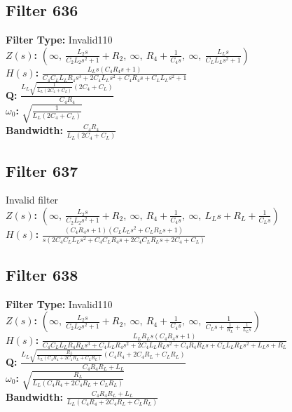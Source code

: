 \documentclass{article}
\begin{document}
\subsection*{Filter 636}
\textbf{Filter Type:} Invalid110 \\ 
\textbf{$Z(s)$:} $\left( \infty, \  \frac{L_{2} s}{C_{2} L_{2} s^{2} + 1} + R_{2}, \  \infty, \  R_{4} + \frac{1}{C_{4} s}, \  \infty, \  \frac{L_{L} s}{C_{L} L_{L} s^{2} + 1}\right)$ \\ 
\textbf{$H(s)$:} $\frac{L_{L} s \left(C_{4} R_{4} s + 1\right)}{C_{4} C_{L} L_{L} R_{4} s^{3} + 2 C_{4} L_{L} s^{2} + C_{4} R_{4} s + C_{L} L_{L} s^{2} + 1}$ \\ 
\textbf{Q:} $\frac{L_{L} \sqrt{\frac{1}{L_{L} \left(2 C_{4} + C_{L}\right)}} \left(2 C_{4} + C_{L}\right)}{C_{4} R_{4}}$ \\ 
\textbf{$\omega_0$:} $\sqrt{\frac{1}{L_{L} \left(2 C_{4} + C_{L}\right)}}$ \\ 
\textbf{Bandwidth:} $\frac{C_{4} R_{4}}{L_{L} \left(2 C_{4} + C_{L}\right)}$ \\ 
\subsection*{Filter 637}
Invalid filter \\ 
\textbf{$Z(s)$:} $\left( \infty, \  \frac{L_{2} s}{C_{2} L_{2} s^{2} + 1} + R_{2}, \  \infty, \  R_{4} + \frac{1}{C_{4} s}, \  \infty, \  L_{L} s + R_{L} + \frac{1}{C_{L} s}\right)$ \\ 
\textbf{$H(s)$:} $\frac{\left(C_{4} R_{4} s + 1\right) \left(C_{L} L_{L} s^{2} + C_{L} R_{L} s + 1\right)}{s \left(2 C_{4} C_{L} L_{L} s^{2} + C_{4} C_{L} R_{4} s + 2 C_{4} C_{L} R_{L} s + 2 C_{4} + C_{L}\right)}$ \\ 
\subsection*{Filter 638}
\textbf{Filter Type:} Invalid110 \\ 
\textbf{$Z(s)$:} $\left( \infty, \  \frac{L_{2} s}{C_{2} L_{2} s^{2} + 1} + R_{2}, \  \infty, \  R_{4} + \frac{1}{C_{4} s}, \  \infty, \  \frac{1}{C_{L} s + \frac{1}{R_{L}} + \frac{1}{L_{L} s}}\right)$ \\ 
\textbf{$H(s)$:} $\frac{L_{L} R_{L} s \left(C_{4} R_{4} s + 1\right)}{C_{4} C_{L} L_{L} R_{4} R_{L} s^{3} + C_{4} L_{L} R_{4} s^{2} + 2 C_{4} L_{L} R_{L} s^{2} + C_{4} R_{4} R_{L} s + C_{L} L_{L} R_{L} s^{2} + L_{L} s + R_{L}}$ \\ 
\textbf{Q:} $\frac{L_{L} \sqrt{\frac{R_{L}}{L_{L} \left(C_{4} R_{4} + 2 C_{4} R_{L} + C_{L} R_{L}\right)}} \left(C_{4} R_{4} + 2 C_{4} R_{L} + C_{L} R_{L}\right)}{C_{4} R_{4} R_{L} + L_{L}}$ \\ 
\textbf{$\omega_0$:} $\sqrt{\frac{R_{L}}{L_{L} \left(C_{4} R_{4} + 2 C_{4} R_{L} + C_{L} R_{L}\right)}}$ \\ 
\textbf{Bandwidth:} $\frac{C_{4} R_{4} R_{L} + L_{L}}{L_{L} \left(C_{4} R_{4} + 2 C_{4} R_{L} + C_{L} R_{L}\right)}$ \\ 
\end{document}

